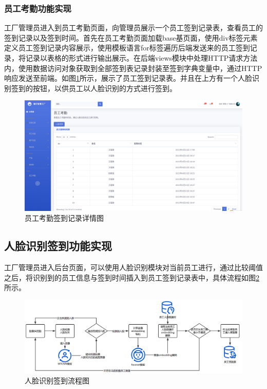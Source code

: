 \subsubsection{员工考勤功能实现}

工厂管理员进入到员工考勤页面，向管理员展示一个员工签到记录表，查看员工的签到记录以及签到时间。首先在员工考勤页面加载base基页面，使用div标签元素定义员工签到记录内容展示，使用模板语言for标签遍历后端发送来的员工签到记录，将记录以表格的形式进行输出展示。在后端views模块中处理HTTP请求方法内，使用数据访问对象获取到全部签到表记录封装至签到字典变量中，通过HTTP响应发送至前端。如图\ref{fig:empleatd}所示，展示了员工签到记录表。并且在上方有一个人脸识别签到的按钮，以供员工以人脸识别的方式进行签到。

\begin{figure}[H]
    \centering
    \includegraphics[width=.75\textwidth]{figures/5empleatd.png}
    \caption{员工考勤签到记录详情图}
    \label{fig:empleatd}
\end{figure}

\subsection{人脸识别签到功能实现}


工厂管理员进入后台页面，可以使用人脸识别模块对当前员工进行，通过比较阈值之后，将识别到的员工信息与签到时间插入到员工签到记录表中，具体流程如图\ref{fig:fcprcs}所示。

\begin{figure}[H]
    \centering
    \includegraphics[width=\textwidth]{figures/5fcprcs.png}
    \caption{人脸识别签到流程图}
    \label{fig:fcprcs}
\end{figure}

